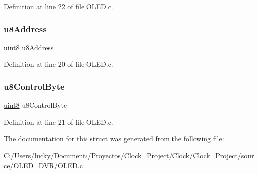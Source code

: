 Definition at line 22 of file O\+L\+E\+D.\+c.

\mbox{\label{struct_o_l_e_d__st_bus_msg_a932b59335d55254051885be73fae32ef}} 
\subsubsection{\texorpdfstring{u8Address}{u8Address}}
{\footnotesize\ttfamily \mbox{\hyperlink{_p_i_t_8h_adde6aaee8457bee49c2a92621fe22b79}{uint8}} u8\+Address}



Definition at line 20 of file O\+L\+E\+D.\+c.

\mbox{\label{struct_o_l_e_d__st_bus_msg_a1f20ee17dfcc4c06230785e42d9a61ef}} 
\subsubsection{\texorpdfstring{u8ControlByte}{u8ControlByte}}
{\footnotesize\ttfamily \mbox{\hyperlink{_p_i_t_8h_adde6aaee8457bee49c2a92621fe22b79}{uint8}} u8\+Control\+Byte}



Definition at line 21 of file O\+L\+E\+D.\+c.



The documentation for this struct was generated from the following file\+:\begin{DoxyCompactItemize}
\item 
C\+:/\+Users/lucky/\+Documents/\+Proyectos/\+Clock\+\_\+\+Project/\+Clock/\+Clock\+\_\+\+Project/source/\+O\+L\+E\+D\+\_\+\+D\+V\+R/\mbox{\hyperlink{_o_l_e_d_8c}{O\+L\+E\+D.\+c}}\end{DoxyCompactItemize}

